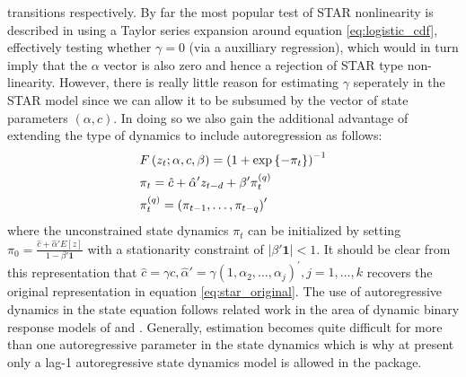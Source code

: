 transitions respectively. By far the most popular test of STAR nonlinearity is described 
in \cite{Luukkonen1988} using a Taylor series expansion around
equation \ref{eq:logistic_cdf}, effectively testing whether $\gamma=0$ (via
a auxilliary regression), which would in turn imply that the $\alpha$ vector is
also zero and hence a rejection of STAR type non-linearity.
However, there is really little reason for estimating $\gamma$ seperately in the
STAR model since we can allow it to be subsumed by the vector of state 
parameters $\left(\alpha, c \right)$. In doing so we also gain the additional
advantage of extending the type of dynamics to include autoregression as
follows:
\begin{equation}\label{eq:star_new}
\begin{gathered}
  F\left( {{z_t};\alpha ,c,\beta} \right) = {\left( {1 + \exp \left\{ -{{\pi
  _t}} \right\}} \right)^{ - 1}} \hfill \\
  {\pi _t} = \hat c + \hat \alpha '{z_{t-d}} + \beta '\pi _t^{\left( q \right)} \hfill \\
  \pi _t^{\left( q \right)} = {\left( {{\pi _{t - 1}},\dots,{\pi _{t - q}}}
  \right)^\prime } \hfill \\
\end{gathered}
\end{equation}
where the unconstrained state dynamics $\pi_t$ can be initialized by setting
${\pi _0} =\frac{{\hat c + \hat \alpha 'E\left[ z \right]}}{{1 - \beta
'{\mathbf{1}}}}$ with a stationarity constraint of $\left| {\beta
'{\mathbf{1}}} \right| < 1$.
It should be  clear from this representation that  $\hat c = \gamma c,\hat
\alpha ' = \gamma {\left( {1,{\alpha _2},\dots,{\alpha _j}} \right)^\prime },j =
1,\dots,k$ recovers the  original representation in equation
\ref{eq:star_original}. The use of  autoregressive dynamics in the state
equation follows related work in the  area of dynamic binary response models of 
\cite{Kauppi2008} and \cite{Nyberg2010}.
Generally, estimation becomes quite difficult for more than one autoregressive
parameter in the state dynamics which is why at present only a lag-1
autoregressive state dynamics model is allowed in the package.

